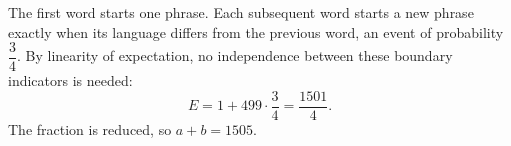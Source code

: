 The first word starts one phrase. Each subsequent word starts a new phrase exactly when its language differs from the previous word, an event of probability $\dfrac{3}{4}$. By linearity of expectation, no independence between these boundary indicators is needed:
\[
E=1+499\cdot\dfrac{3}{4}=\dfrac{1501}{4}.
\]
The fraction is reduced, so $\boxed{a+b=1505}$.
